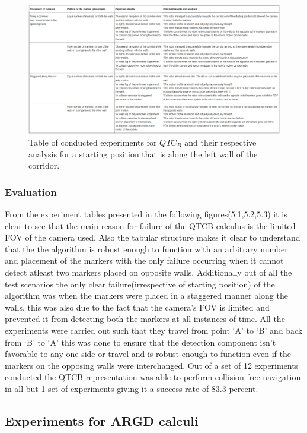 \begin{figure}
	\includegraphics[scale = 0.6]{images/left_table}
	\caption{Table of conducted experiments for $QTC_B$ and their respective analysis for a starting position that is along the left wall of the corridor.}
	\label{fig:left-table}
\end{figure}

\subsubsection*{Evaluation} From the experiment tables presented in the following figures(5.1,5.2,5.3) it is clear to see that the main reason for failure of the QTCB calculus is the limited FOV of the camera used. Also the tabular structure makes it clear to understand that the the algorithm is robust enough to function with an arbitrary number and placement of the markers with the only failure occurring when it cannot detect atleast two markers placed on opposite walls. Additionally out of all the test scenarios the only clear failure(irrespective of starting position) of the algorithm was when the markers were placed in a staggered manner along the walls, this was also due to the fact that the camera's FOV is limited and prevented it from detecting both the markers at all instances of time. All the experiments were carried out such that they travel from point `A' to `B' and back from `B' to `A' this was done to ensure that the detection component isn't favorable to any one side or travel and is robust enough to function even if the markers on the opposing walls were interchanged. Out of a set of 12 experiments conducted the QTCB representation was able to perform collision free navigation in all but 1 set of experiments giving it a success rate of 83.3 percent.

\subsection{Experiments for ARGD calculi}
